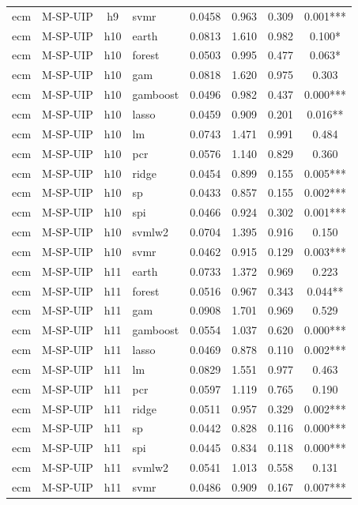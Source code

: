 \begin{ThreePartTable}
\begin{longtable}[t]{llclcccc}
ecm & M-SP-UIP & h9 & svmr & 0.0458 & 0.963 & 0.309 & 0.001***\\
\addlinespace
ecm & M-SP-UIP & h10 & earth & 0.0813 & 1.610 & 0.982 & 0.100*\\
ecm & M-SP-UIP & h10 & forest & 0.0503 & 0.995 & 0.477 & 0.063*\\
ecm & M-SP-UIP & h10 & gam & 0.0818 & 1.620 & 0.975 & 0.303\\
ecm & M-SP-UIP & h10 & gamboost & 0.0496 & 0.982 & 0.437 & 0.000***\\
ecm & M-SP-UIP & h10 & lasso & 0.0459 & 0.909 & 0.201 & 0.016**\\
ecm & M-SP-UIP & h10 & lm & 0.0743 & 1.471 & 0.991 & 0.484\\
ecm & M-SP-UIP & h10 & pcr & 0.0576 & 1.140 & 0.829 & 0.360\\
ecm & M-SP-UIP & h10 & ridge & 0.0454 & 0.899 & 0.155 & 0.005***\\
ecm & M-SP-UIP & h10 & sp & 0.0433 & 0.857 & 0.155 & 0.002***\\
ecm & M-SP-UIP & h10 & spi & 0.0466 & 0.924 & 0.302 & 0.001***\\
ecm & M-SP-UIP & h10 & svmlw2 & 0.0704 & 1.395 & 0.916 & 0.150\\
ecm & M-SP-UIP & h10 & svmr & 0.0462 & 0.915 & 0.129 & 0.003***\\
\addlinespace
ecm & M-SP-UIP & h11 & earth & 0.0733 & 1.372 & 0.969 & 0.223\\
ecm & M-SP-UIP & h11 & forest & 0.0516 & 0.967 & 0.343 & 0.044**\\
ecm & M-SP-UIP & h11 & gam & 0.0908 & 1.701 & 0.969 & 0.529\\
ecm & M-SP-UIP & h11 & gamboost & 0.0554 & 1.037 & 0.620 & 0.000***\\
ecm & M-SP-UIP & h11 & lasso & 0.0469 & 0.878 & 0.110 & 0.002***\\
ecm & M-SP-UIP & h11 & lm & 0.0829 & 1.551 & 0.977 & 0.463\\
ecm & M-SP-UIP & h11 & pcr & 0.0597 & 1.119 & 0.765 & 0.190\\
ecm & M-SP-UIP & h11 & ridge & 0.0511 & 0.957 & 0.329 & 0.002***\\
ecm & M-SP-UIP & h11 & sp & 0.0442 & 0.828 & 0.116 & 0.000***\\
ecm & M-SP-UIP & h11 & spi & 0.0445 & 0.834 & 0.118 & 0.000***\\
ecm & M-SP-UIP & h11 & svmlw2 & 0.0541 & 1.013 & 0.558 & 0.131\\
ecm & M-SP-UIP & h11 & svmr & 0.0486 & 0.909 & 0.167 & 0.007***\\

\end{longtable}
\end{ThreePartTable}
